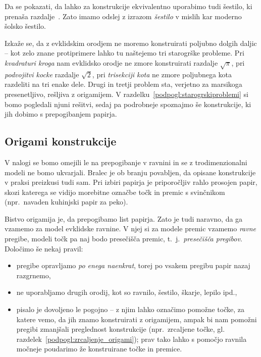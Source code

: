 \begin{opomba}
    \label{opom:solsko_sestilo}
    Da se pokazati, da lahko za konstrukcije ekvivalentno uporabimo tudi šestilo, ki prenaša razdalje~\cite[str.\ 6--7]{geometricconstructions}. Zato imamo odslej z izrazom \emph{šestilo} v mislih kar moderno šolsko šestilo.
\end{opomba}

Izkaže se, da z evklidskim orodjem ne moremo konstruirati poljubno dolgih daljic -- kot zelo znane protiprimere lahko tu naštejemo tri starogrške probleme. Pri \emph{kvadraturi kroga} nam evklidsko orodje ne zmore konstruirati razdalje $\sqrt{\pi}$, pri \emph{podvojitvi kocke} razdalje $\sqrt{2}$, pri \emph{trisekciji kota} ne zmore poljubnega kota razdeliti na tri enake dele. Drugi in tretji problem sta, verjetno za marsikoga presenetljivo, rešljiva z origamijem. V razdelku~\ref{podpogl:starogrskiproblemi} si bomo pogledali njuni rešitvi, sedaj pa podrobneje spoznajmo še konstrukcije, ki jih dobimo s prepogibanjem papirja.

\subsection{Origami konstrukcije}
\label{origami_konstrukcije}

V nalogi se bomo omejili le na prepogibanje v ravnini in se z trodimenzionalni modeli ne bomo ukvarjali. Bralec je ob branju povabljen, da opisane konstrukcije v praksi preizkusi tudi sam. Pri izbiri papirja je priporočljiv rahlo prosojen papir, skozi katerega se vidijo morebitne označbe točk in premic s svinčnikom (npr.\ navaden kuhinjski papir za peko).

Bistvo origamija je, da prepogibamo list papirja. Zato je tudi naravno, da ga vzamemo za model evklidske ravnine. V njej si za modele premic vzamemo \emph{ravne} pregibe, modeli točk pa naj bodo presečišča premic, t.\ j.\ \emph{presečišča pregibov}. Določimo še nekaj pravil:
\begin{itemize}
    \item pregibe opravljamo \emph{po enega naenkrat}, torej po vsakem pregibu papir nazaj razgrnemo,
    \item ne uporabljamo drugih orodij, kot so ravnilo, šestilo, škarje, lepilo ipd.,
    \item pisalo je dovoljeno le pogojno -- z njim lahko označimo pomožne točke, za katere vemo, da jih znamo konstruirati z origamijem, ampak bi nam pomožni pregibi zmanjšali preglednost konstrukcije (npr.\ zrcaljene točke, gl. razdelek~\ref{podpogl:zrcaljenje_origami}); prav tako lahko s pomočjo ravnila močneje poudarimo že konstruirane točke in premice.
\end{itemize}

